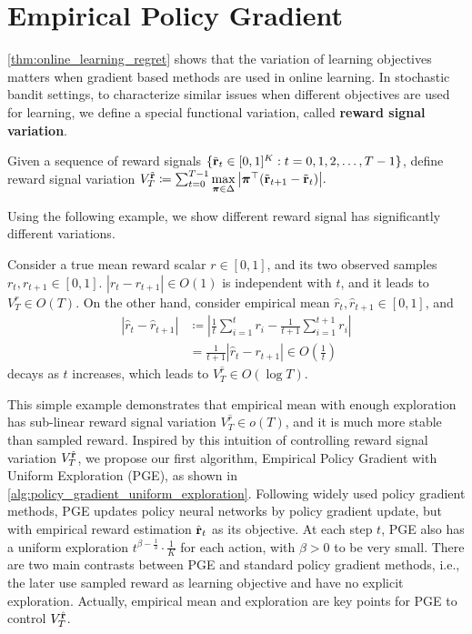 \section{Empirical Policy Gradient}
\label{sec:policy_gradient}

\cref{thm:online_learning_regret} shows that the variation of learning objectives matters when gradient based methods are used in online learning. In stochastic bandit settings, to characterize similar issues when different objectives are used for learning, we define a special functional variation, called \textbf{reward signal variation}.

\begin{defi}
\label{defi:reward_signal_variation}
Given a sequence of reward signals $\{ \tilde{{\mathbf{r}}}_t \in [0,1]^K: t = 0, 1, 2, \dots, T-1 \}$, define reward signal variation
$V_{T}^{\tilde{{\mathbf{r}}}} \coloneqq \sum_{t=0}^{T-1}{\max\limits_{{\boldsymbol{\pi}} \in \Delta}{\left| {\boldsymbol{\pi}}^\top(\tilde{{\mathbf{r}}}_{t+1} - \tilde{{\mathbf{r}}}_{t}) \right| } }.$
\end{defi}

Using the following example, we show different reward signal has significantly different variations.

\begin{eg}
Consider a true mean reward scalar $r \in [0, 1]$, and its two observed samples $r_t, r_{t+1} \in [0, 1]$. $\left| r_t - r_{t+1} \right| \in O(1)$ is independent with $t$, and it leads to $V_T^r \in O(T)$. On the other hand, consider empirical mean $\hat{r}_t, \hat{r}_{t+1} \in [0, 1]$, and
\begin{equation*}
\begin{split}
	\left| \hat{r}_{t} - \hat{r}_{t+1} \right| &\coloneqq \left| \frac{1}{t} \sum_{i=1}^{t}{ r_i } - \frac{1}{t+1} \sum_{i=1}^{t+1}{ r_i } \right| \\
	&= \frac{1}{t+1} \left| \hat{r}_t - r_{t+1} \right| \in O\left(\frac{1}{t}\right)
\end{split}
\end{equation*}
decays as $t$ increases, which leads to $V_T^{\hat{r}} \in O(\log{T})$.
\end{eg}

This simple example demonstrates that empirical mean with enough exploration has sub-linear reward signal variation $V_T^{\hat{r}} \in o(T)$, and it is  much more stable than sampled reward. Inspired by this intuition of controlling reward signal variation $V_T^{\tilde{{\mathbf{r}}}}$, we propose our first algorithm, Empirical Policy Gradient with Uniform Exploration (PGE), as shown in \cref{alg:policy_gradient_uniform_exploration}. Following widely used policy gradient methods, PGE updates policy neural networks by policy gradient update, but with empirical reward estimation $\hat{{\mathbf{r}}}_t$ as its objective. At each step $t$, PGE also has a uniform exploration $t^{ \beta - \frac{1}{3}} \cdot \frac{1}{K}$ for each action, with $\beta > 0$ to be very small. There are two main contrasts between PGE and standard policy gradient methods, i.e., the later use sampled reward as learning objective and have no explicit exploration. Actually, empirical mean and exploration are key points for PGE to control $V_T^{\hat{{\mathbf{r}}}}$. 
 
